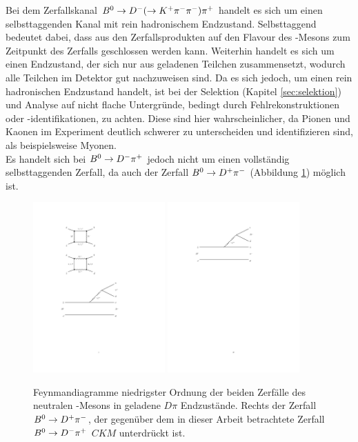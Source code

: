 Bei dem Zerfallskanal ${{B}^0}\rightarrow{\ensuremath{{D}^-}}(\rightarrow {\ensuremath{{K}^+}}{\ensuremath{{\pi}^-}}{\ensuremath{{\pi}^-}}){{\pi}^+}$ handelt es sich um einen selbsttaggenden Kanal mit rein hadronischem Endzustand. Selbsttaggend bedeutet dabei, dass aus den Zerfallsprodukten auf den Flavour des \B-Mesons zum Zeitpunkt des Zerfalls geschlossen werden kann. Weiterhin handelt es sich um einen Endzustand, der sich nur aus geladenen Teilchen zusammensetzt, wodurch alle Teilchen im Detektor gut nachzuweisen sind. Da es sich jedoch, um einen rein hadronischen Endzustand handelt, ist bei der Selektion (Kapitel \ref{sec:selektion}) und Analyse auf nicht flache Untergründe, bedingt durch Fehlrekonstruktionen oder -identifikationen, zu achten. Diese sind hier wahrscheinlicher, da Pionen und Kaonen im Experiment deutlich schwerer zu unterscheiden und identifizieren sind, als beispielsweise Myonen.\\
Es handelt sich bei ${{B}^0}\rightarrow {\ensuremath{{D}^-}}{\ensuremath{{\pi}^+}}$ jedoch nicht um einen vollständig selbsttaggenden Zerfall, da auch der Zerfall ${{B}^0}\rightarrow D^+{{\pi}^-}$ (Abbildung \ref{fig:b2dpi}) möglich ist. 
\begin{figure}[htpb]
	\centering
		\includegraphics[width=0.45\textwidth]{fig/B2D-pi+.pdf}
		\includegraphics[width=0.45\textwidth]{fig/B2D+pi-.pdf}
	\caption{Feynmandiagramme niedrigster Ordnung der beiden Zerfälle des neutralen \B-Mesons in geladene $D\pi$ Endzustände. Rechts der Zerfall ${{B}^0}\rightarrow D^+{{\pi}^-}$, der gegenüber dem in dieser Arbeit betrachtete Zerfall ${{B}^0}\rightarrow {\ensuremath{{D}^-}}{\ensuremath{{\pi}^+}}$ $C\!K\!M$ unterdrückt ist.}
	\label{fig:b2dpi} 
\end{figure}  
